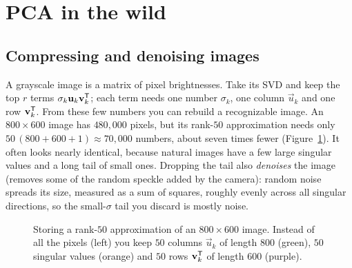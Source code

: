 \section{PCA in the wild}

\subsection{Compressing and denoising images}

A grayscale image is a matrix of pixel brightnesses. Take its SVD and keep the top
$r$ terms $\sigma_k\mathbf{u}_k\mathbf{v}_k^{\mathsf{T}}$; each term needs one number $\sigma_k$, one
column $\vec u_k$ and one row $\mathbf{v}_k^{\mathsf{T}}$. From these few numbers you can rebuild a
recognizable image. An $800\times600$ image has $480{,}000$ pixels, but its rank-$50$
approximation needs only $50\,(800+600+1)\approx 70{,}000$ numbers, about seven times
fewer (Figure~\ref{ch30:storage}). It often looks nearly identical, because natural
images have a few large singular values and a long tail of small ones. Dropping the
tail also \emph{denoises} the image (removes some of the random speckle added by
the camera): random noise spreads its size, measured as a sum of squares, roughly
evenly across all singular directions, so the small-$\sigma$ tail you discard is
mostly noise.

\begin{figure}[htbp]
\centering
{}
\caption{Storing a rank-$50$ approximation of an $800\times600$ image. Instead of
all the pixels (left) you keep $50$ columns $\vec u_k$ of length $800$ (green),
$50$ singular values (orange) and $50$ rows $\mathbf{v}_k^{\mathsf{T}}$ of length $600$ (purple).}
\label{ch30:storage}
\end{figure}

